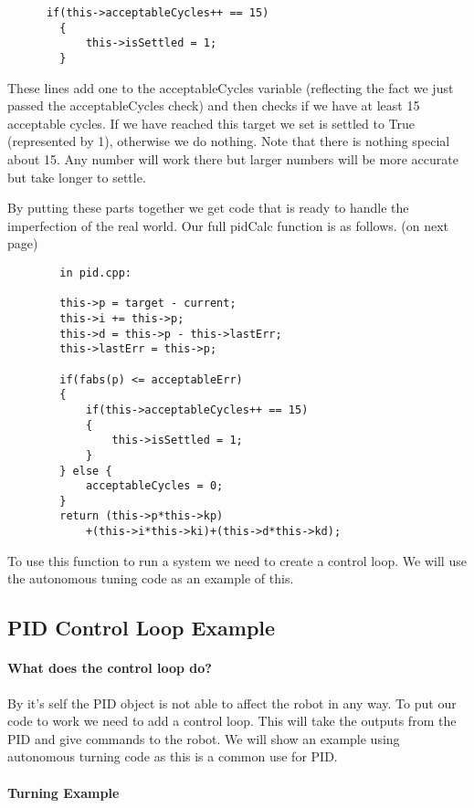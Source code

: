 \documentclass[12pt]{article}
\begin{document}
    \begin{verbatim}
      if(this->acceptableCycles++ == 15)
        {
            this->isSettled = 1;
        }
    \end{verbatim}

    These lines add one to the acceptableCycles variable (reflecting the fact we just passed the acceptableCycles check) and then checks if we have at least 15 acceptable cycles. If we have reached this target we set is settled to True (represented by 1), otherwise we do nothing. Note that there is nothing special about 15. Any number will work there but larger numbers will be more accurate but take longer to settle.

    By putting these parts together we get code that is ready to handle the imperfection of the real world. Our full pidCalc function is as follows. (on next page)

    \begin{verbatim}
        in pid.cpp:

        this->p = target - current;
        this->i += this->p;
        this->d = this->p - this->lastErr;
        this->lastErr = this->p;

        if(fabs(p) <= acceptableErr)
        {
            if(this->acceptableCycles++ == 15)
            {
                this->isSettled = 1;
            }
        } else {
            acceptableCycles = 0;
        }
        return (this->p*this->kp)
            +(this->i*this->ki)+(this->d*this->kd);
    \end{verbatim}

    To use this function to run a system we need to create a control loop. We will use the autonomous tuning code as an example of this.

\subsection{PID Control Loop Example}
\paragraph{What does the control loop do?}
    By it's self the PID object is not able to affect the robot in any way. To put our code to work we need to add a control loop. This will take the outputs from the PID and give commands to the robot. We will show an example using autonomous turning code as this is a common use for PID.

\paragraph{Turning Example}
\end{document}
